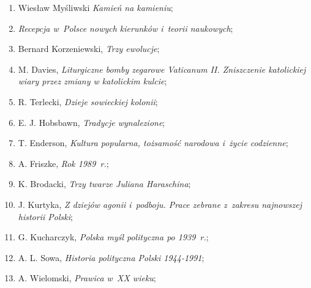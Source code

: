 \documentclass[a4paper,11pt]{article}
\begin{document}
\begin{enumerate}

\item Wiesław Myśliwski \textit{Kamień na kamieniu};



\item \textit{Recepcja w~Polsce nowych kierunków i~teorii naukowych};



\item Bernard Korzeniewski, \textit{Trzy ewolucje};



\item M. Davies, \textit{Liturgiczne bomby zegarowe Vaticanum II.
    Zniszczenie katolickiej wiary przez zmiany w katolickim kulcie};



\item R. Terlecki, \textit{Dzieje sowieckiej kolonii};



\item E. J. Hobsbawn, \textit{Tradycje wynalezione};



\item T. Enderson, \textit{Kultura popularna, tożsamość narodowa i~życie
    codzienne};



\item A. Friszke, \textit{Rok 1989~r.};



\item K. Brodacki, \textit{Trzy twarze Juliana Haraschina};



\item J. Kurtyka, \textit{Z dziejów agonii i~podboju. Prace zebrane
    z~zakresu najnowszej historii Polski};



\item G. Kucharczyk, \textit{Polska myśl polityczna po 1939~r.};



\item A. L. Sowa, \textit{Historia polityczna Polski 1944-1991};



\item A. Wielomski, \textit{Prawica w~XX wieku};




\end{enumerate}
\end{document}
